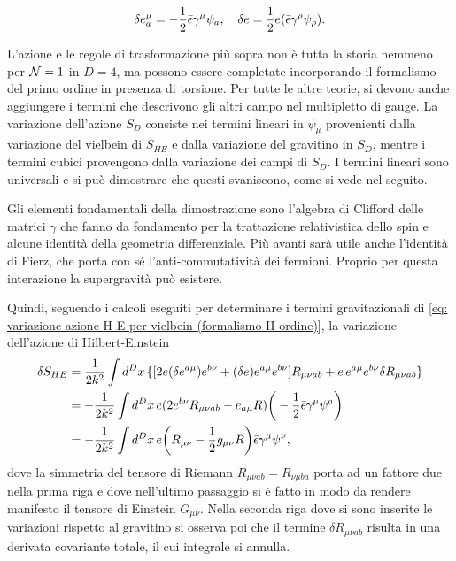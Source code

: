 \begin{equation}
    \delta e^\mu_a = -\frac{1}{2}\bar{\epsilon}\gamma^\mu\psi_a,\quad \delta e = \frac{1}{2}e(\bar{\epsilon}\gamma^\rho\psi_\rho).
\end{equation}
\begin{obs}
    L'azione e le regole di trasformazione più sopra non è tutta la storia nemmeno per $\mathcal{N} = 1$ in $D = 4$, ma possono essere completate incorporando il formalismo del primo ordine in presenza di torsione. Per tutte le altre teorie, si devono anche aggiungere i termini che descrivono gli altri campo nel multipletto di gauge. La variazione dell'azione $S_D$ consiste nei termini lineari in $\psi_\mu$ provenienti dalla variazione del vielbein di $S_{HE}$ e dalla variazione del gravitino in $S_D$, mentre i termini cubici provengono dalla variazione dei campi di $S_D$. I termini lineari sono universali e si può dimostrare che questi svaniscono, come si vede nel seguito.
\end{obs}
Gli elementi fondamentali della dimostrazione sono l'algebra di Clifford delle matrici $\gamma$ che fanno da fondamento per la trattazione relativistica dello spin e alcune identità della geometria differenziale. Più avanti sarà utile anche l'identità di Fierz, che porta con sé l'anti-commutatività dei fermioni. Proprio per questa interazione la supergravità può esistere.

Quindi, seguendo i calcoli eseguiti per determinare i termini gravitazionali di \eqref{eq: variazione azione H-E per vielbein (formalismo II ordine)}, la variazione dell'azione di Hilbert-Einstein
\begin{equation}
\label{eq: variazione azione HE SG (II ordine)}
    \begin{split}
        \delta S_{HE} &= \frac{1}{2k^2}\int d^Dx\,\{[2e(\delta e^{a\mu})e^{b\nu} + (\delta e)e^{a\mu}e^{b\nu}]R_{\mu\nu ab} + e\,e^{a\mu}e^{b\nu}\delta R_{\mu\nu ab}\} \\
        &= -\frac{1}{2k^2}\int d^Dx\,e(2e^{b\nu}R_{\mu\nu ab} - e_{a\mu}R)\bigg(-\frac{1}{2}\bar{\epsilon}\gamma^\mu\psi^a\bigg) \\
        &= -\frac{1}{2k^2}\int d^Dx\,e\bigg(R_{\mu\nu} - \frac{1}{2}g_{\mu\nu}R\bigg)\bar{\epsilon}\gamma^\mu\psi^\nu,
    \end{split} 
\end{equation}
dove la simmetria del tensore di Riemann $R_{\mu\nu ab} = R_{\nu\mu ba}$ porta ad un fattore due nella prima riga e dove nell'ultimo passaggio si è fatto in modo da rendere manifesto il tensore di Einstein $G_{\mu\nu}$. Nella seconda riga dove si sono inserite le variazioni rispetto al gravitino si osserva poi che il termine $\delta R_{\mu\nu ab}$ risulta in una derivata covariante totale, il cui integrale si annulla. 

